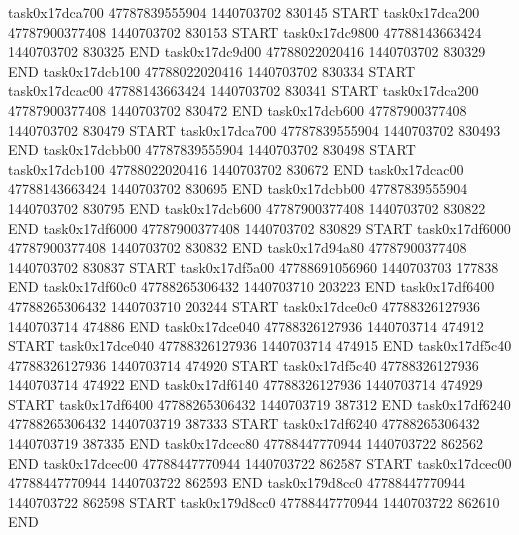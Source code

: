task0x17dca700 47787839555904          1440703702               830145  START
task0x17dca200 47787900377408          1440703702               830153  START
task0x17dc9800 47788143663424          1440703702               830325  END
task0x17dc9d00 47788022020416          1440703702               830329  END
task0x17dcb100 47788022020416          1440703702               830334  START
task0x17dcac00 47788143663424          1440703702               830341  START
task0x17dca200 47787900377408          1440703702               830472  END
task0x17dcb600 47787900377408          1440703702               830479  START
task0x17dca700 47787839555904          1440703702               830493  END
task0x17dcbb00 47787839555904          1440703702               830498  START
task0x17dcb100 47788022020416          1440703702               830672  END
task0x17dcac00 47788143663424          1440703702               830695  END
task0x17dcbb00 47787839555904          1440703702               830795  END
task0x17dcb600 47787900377408          1440703702               830822  END
task0x17df6000 47787900377408          1440703702               830829  START
task0x17df6000 47787900377408          1440703702               830832  END
task0x17d94a80 47787900377408          1440703702               830837  START
task0x17df5a00 47788691056960          1440703703               177838  END
task0x17df60c0 47788265306432          1440703710               203223  END
task0x17df6400 47788265306432          1440703710               203244  START
task0x17dce0c0 47788326127936          1440703714               474886  END
task0x17dce040 47788326127936          1440703714               474912  START
task0x17dce040 47788326127936          1440703714               474915  END
task0x17df5c40 47788326127936          1440703714               474920  START
task0x17df5c40 47788326127936          1440703714               474922  END
task0x17df6140 47788326127936          1440703714               474929  START
task0x17df6400 47788265306432          1440703719               387312  END
task0x17df6240 47788265306432          1440703719               387333  START
task0x17df6240 47788265306432          1440703719               387335  END
task0x17dcec80 47788447770944          1440703722               862562  END
task0x17dcec00 47788447770944          1440703722               862587  START
task0x17dcec00 47788447770944          1440703722               862593  END
task0x179d8cc0 47788447770944          1440703722               862598  START
task0x179d8cc0 47788447770944          1440703722               862610  END
